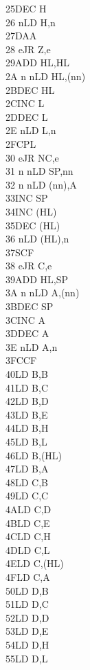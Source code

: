 \documentclass[oneside,a4paper]{book}
\begin{document}
\begin{multicols}{3}
{\begin{tabbing}
25\>DEC H\\
26 n\>LD H,n\\
27\>DAA\\
28 e\>JR Z,e\\
29\>ADD HL,HL\\
2A n n\>LD HL,(nn)\\
2B\>DEC HL\\
2C\>INC L\\
2D\>DEC L\\
2E n\>LD L,n\\
2F\>CPL\\
30 e\>JR NC,e\\
31 n n\>LD SP,nn\\
32 n n\>LD (nn),A\\
33\>INC SP\\
34\>INC (HL)\\
35\>DEC (HL)\\
36 n\>LD (HL),n\\
37\>SCF\\
38 e\>JR C,e\\
39\>ADD HL,SP\\
3A n n\>LD A,(nn)\\
3B\>DEC SP\\
3C\>INC A\\
3D\>DEC A\\
3E n\>LD A,n\\
3F\>CCF\\
40\>LD B,B\\
41\>LD B,C\\
42\>LD B,D\\
43\>LD B,E\\
44\>LD B,H\\
45\>LD B,L\\
46\>LD B,(HL)\\
47\>LD B,A\\
48\>LD C,B\\
49\>LD C,C\\
4A\>LD C,D\\
4B\>LD C,E\\
4C\>LD C,H\\
4D\>LD C,L\\
4E\>LD C,(HL)\\
4F\>LD C,A\\
50\>LD D,B\\
51\>LD D,C\\
52\>LD D,D\\
53\>LD D,E\\
54\>LD D,H\\
55\>LD D,L\\

\end{tabbing}}
\end{multicols}
\end{document}
